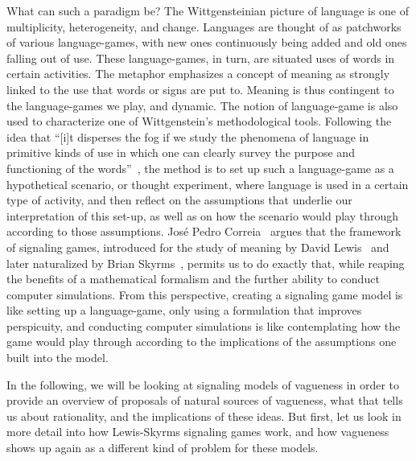 \documentclass[a4paper]{article}
\begin{document}
What can such a paradigm be?
The Wittgensteinian picture of language is one of multiplicity, heterogeneity, and change.
Languages are thought of as patchworks of various language-games, with new ones continuously being added and old ones falling out of use.
These language-games, in turn, are situated uses of words in certain activities.
The metaphor emphasizes a concept of meaning as strongly linked to the use that words or signs are put to.
Meaning is thus contingent to the language-games we play, and dynamic.
The notion of language-game is also used to characterize one of Wittgenstein's methodological tools.
Following the idea that ``[i]t disperses the fog if we study the phenomena of language in primitive kinds of use in which one can clearly survey the purpose and functioning of the words''~\parencite*[\S 5]{wittgenstein_philosophical_1953}, the method is to set up such a language-game as a hypothetical scenario, or thought experiment, where language is used in a certain type of activity, and then reflect on the assumptions that underlie our interpretation of this set-up, as well as on how the scenario would play through according to those assumptions.
Jos\'e Pedro Correia~\parencite*{correia_bivalent_2013} argues that the framework of signaling games, introduced for the study of meaning by David Lewis~\parencite*{lewis_convention_1969} and later naturalized by Brian Skyrms~\parencite*{skyrms_evolution_1996,skyrms_signals_2010}, permits us to do exactly that, while reaping the benefits of a mathematical formalism and the further ability to conduct computer simulations.
From this perspective, creating a signaling game model is like setting up a language-game, only using a formulation that improves perspicuity, and conducting computer simulations is like contemplating how the game would play through according to the implications of the assumptions one built into the model.

In the following, we will be looking at signaling models of vagueness in order to provide an overview of proposals of natural sources of vagueness, what that tells us about rationality, and the implications of these ideas.
But first, let us look in more detail into how Lewis-Skyrms signaling games work, and how vagueness shows up again as a different kind of problem for these models.
\end{document}
